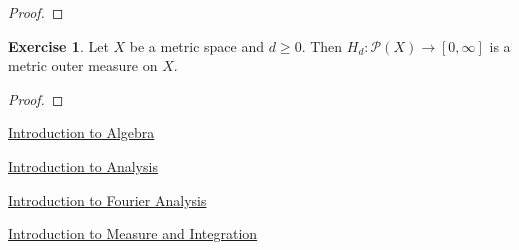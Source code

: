 \documentclass[12pt]{amsart}
\theoremstyle{definition}
\newtheorem{ex}[definition]{Exercise}
\newcommand{\MP}{\mathcal{P}}
\begin{document}
	\begin{proof}
	
	\end{proof}
	
	\begin{ex}
	Let $X$ be a metric space and $d \geq 0$. Then $H_d: \MP(X) \rightarrow [0, \infty]$ is a metric outer measure on $X$.
	\end{ex}
	
	\begin{proof}
	
	\end{proof}
	
	
	
	
	
	
	
	
	
	
	
	
	
	
	
	
	
	
	
	
	
	
	
	
	
	
	
	
	
	
	
	
	
	
	
	
	
	
	
	
	
	
	
	
	
	
	
	
	
	
	
	
	
	
	
	
	
	
	
	
	
	
	
	
	
	
	
	
	
	
	
	
	
	\newpage
	\begin{thebibliography}{4}
 \href{https://github.com/carsonaj/Mathematics/blob/master/Introduction\%20to\%20Algebra/Introduction\%20to\%20Algebra.pdf}{Introduction to Algebra}

  \href{https://github.com/carsonaj/Mathematics/blob/master/Introduction\%20to\%20Analysis/Introduction\%20to\%20Analysis.pdf}{Introduction to Analysis}	

  \href{https://github.com/carsonaj/Mathematics/blob/master/Introduction\%20to\%20Fourier\%20Analysis/Introduction\%20to\%20Fourier\%20Analysis.pdf}{Introduction to Fourier Analysis}

  \href{https://github.com/carsonaj/Mathematics/blob/master/Introduction\%20to\%20Measure\%20and\%20Integration/Introduction\%20to\%20Measure\%20and\%20Integration.pdf}{Introduction to Measure and Integration}



\end{thebibliography}

	
	
	
	
	
	
	
	
\end{document}
